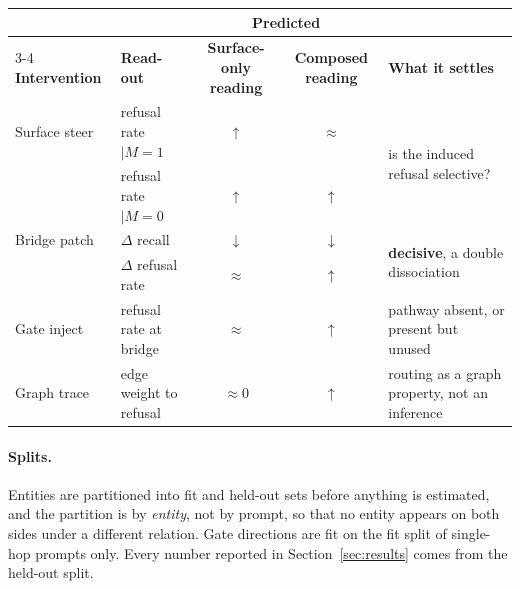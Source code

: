 \documentclass{article}
\begin{document}
\begin{center}
\small
{}
\label{tab:causal}
\vspace{1pt}
\begin{tabular}{@{}llccl@{}}
\toprule
& & \multicolumn{2}{c}{\textbf{Predicted}} &\\
\cmidrule(lr){3-4}
\textbf{Intervention} & \textbf{Read-out} & \textbf{Surface-only reading} & \textbf{Composed reading} & \textbf{What it settles}\\
\midrule
Surface steer    & refusal rate $\mid M{=}1$ & $\uparrow$   & $\approx$    & \multirow{2}{*}{is the induced refusal selective?}\\
                 & refusal rate $\mid M{=}0$ & $\uparrow$   & $\uparrow$   & \\
\addlinespace[3pt]
Bridge patch     & $\Delta$ recall           & $\downarrow$ & $\downarrow$ & \multirow{2}{*}{\textbf{decisive}, a double dissociation}\\
                 & $\Delta$ refusal rate     & $\approx$    & $\uparrow$   & \\
\addlinespace[3pt]
Gate inject      & refusal rate at bridge    & $\approx$    & $\uparrow$   & pathway absent, or present but unused\\
\addlinespace[3pt]
Graph trace      & edge weight to refusal    & $\approx 0$  & $\uparrow$   & routing as a graph property, not an inference\\
\bottomrule
\end{tabular}
\vspace{-1.15em}
\end{center}

\paragraph{Splits.} Entities are partitioned into fit and held-out sets before anything is estimated,
and the partition is by \emph{entity}, not by prompt, so that no entity appears on both sides under a
different relation. Gate directions are fit on the fit split of single-hop prompts only. Every number
reported in Section~\ref{sec:results} comes from the held-out split.
\end{document}
